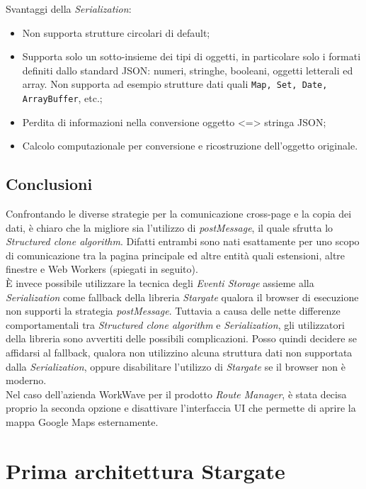 Svantaggi della \textit{Serialization}:

\begin{itemize}
    \item Non supporta strutture circolari di default;
    \item Supporta solo un sotto-insieme dei tipi di oggetti, in particolare solo i formati definiti dallo standard JSON: numeri, stringhe, booleani, oggetti letterali ed array. Non supporta ad esempio strutture dati quali \texttt{Map, Set, Date, ArrayBuffer}, etc.;
    \item Perdita di informazioni nella conversione oggetto <=> stringa JSON;
    \item Calcolo computazionale per conversione e ricostruzione dell'oggetto originale.
\end{itemize}

\subsection{Conclusioni}

Confrontando le diverse strategie per la comunicazione cross-page e la copia dei dati, è chiaro che la migliore sia l'utilizzo di \textit{postMessage}, il quale sfrutta lo \textit{Structured clone algorithm}. Difatti entrambi sono nati esattamente per uno scopo di comunicazione tra la pagina principale ed altre entità quali estensioni, altre finestre e Web Workers (spiegati in seguito).\\

È invece possibile utilizzare la tecnica degli \textit{Eventi Storage} assieme alla \textit{Serialization} come fallback della libreria \textit{Stargate} qualora il browser di esecuzione non supporti la strategia \textit{postMessage}. Tuttavia a causa delle nette differenze comportamentali tra \textit{Structured clone algorithm} e \textit{Serialization}, gli utilizzatori della libreria sono avvertiti delle possibili complicazioni. Posso quindi decidere se affidarsi al fallback, qualora non utilizzino alcuna struttura dati non supportata dalla \textit{Serialization}, oppure disabilitare l'utilizzo di \textit{Stargate} se il browser non è moderno.\\

Nel caso dell'azienda WorkWave per il prodotto \textit{Route Manager}, è stata decisa proprio la seconda opzione e disattivare l'interfaccia UI che permette di aprire la mappa Google Maps esternamente.

\section{Prima architettura Stargate}

